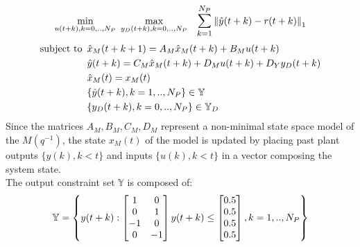 \documentclass[letterpaper, 10 pt, conference]{ieeeconf}  %
\newcommand{\norm}[1]{\left\lVert#1\right\rVert}
\newcommand{\AB}[1]{\textbf{\color{magenta}{[AB: #1]}}}
\begin{document}
\begin{equation}
\small
\begin{matrix}
\begin{aligned}
\underset{u(t+k),k=0,..,N_P}{\text{min}} \hspace{5pt} \underset{y_D(t+k),k=0,..,N_P}{\text{max}}
&  \hspace{10pt} \mathlarger{\sum\limits_{k=1}^{N_P}}\norm{\hat y(t+k)-r(t+k)}_1 \\ \hspace{-200pt}
\end{aligned} \vspace{-10pt}\\
\begin{aligned}
\text{subject to}
& \hspace{5pt} \hat{x}_M(t+k+1) = A_M\hat{x}_M(t+k) + B_Mu(t+k)\\
& \hspace{5pt} \hat{y}(t+k) = C_M\hat{x}_M(t+k) + D_Mu(t+k)+D_Yy_D(t+k) \\
& \hspace{5pt} \hat{x}_M(t)=x_M(t) \\
& \hspace{5pt} \{\hat{y}(t+k),k=1,..,N_P\} \in \mathbb{Y} \\
& \hspace{5pt} \{y_D(t+k),k=0,..,N_P\} \in \mathbb{Y}_D
\end{aligned}
\end{matrix}
\label{RMPC_YD_minmax}
\end{equation}
Since the matrices $A_M,B_M,C_M,D_M$ represent a non-minimal state space model of the $M(q^{-1})$, the state $x_M(t)$ of the model is updated by placing past plant outputs $\{y(k),k<t\}$ and inputs $\{u(k),k<t\}$ in a vector composing the system state.\\
 The output constraint set $\mathbb{Y}$ is composed of:
 \begin{equation}
 \small
 \mathbb{Y}=\begin{Bmatrix}y(t+k):\begin{bmatrix} 1 & 0 \\ 0 & 1 \\ -1 & 0 \\ 0 & -1 \end{bmatrix} y(t+k) \leq \begin{bmatrix} 0.5 \\ 0.5 \\ 0.5 \\ 0.5 \end{bmatrix}, k=1,..,N_P\end{Bmatrix}
 \end{equation}
\end{document}
